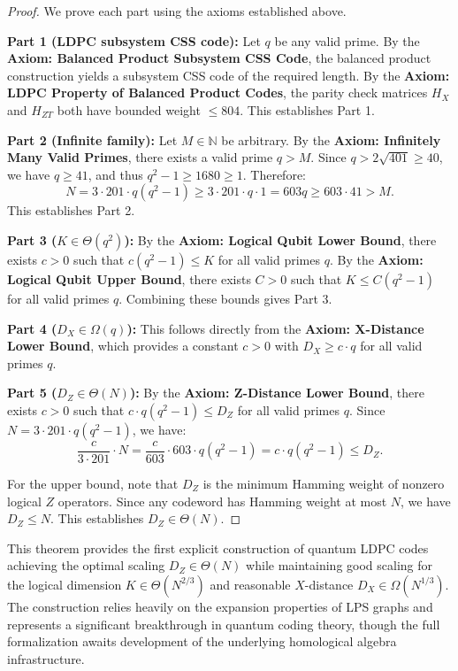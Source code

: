 \documentclass[11pt]{article}
\theoremstyle{plain}
\theoremstyle{definition}
\theoremstyle{remark}
\begin{document}
\begin{proof}
We prove each part using the axioms established above.

\textbf{Part 1 (LDPC subsystem CSS code):} Let $q$ be any valid prime. By the \textbf{Axiom: Balanced Product Subsystem CSS Code}, the balanced product construction yields a subsystem CSS code of the required length. By the \textbf{Axiom: LDPC Property of Balanced Product Codes}, the parity check matrices $H_X$ and $H_{ZT}$ both have bounded weight $\leq 804$. This establishes Part 1.

\textbf{Part 2 (Infinite family):} Let $M \in \mathbb{N}$ be arbitrary. By the \textbf{Axiom: Infinitely Many Valid Primes}, there exists a valid prime $q > M$. Since $q > 2\sqrt{401} \geq 40$, we have $q \geq 41$, and thus $q^2 - 1 \geq 1680 \geq 1$. Therefore:
\[
N = 3 \cdot 201 \cdot q(q^2-1) \geq 3 \cdot 201 \cdot q \cdot 1 = 603q \geq 603 \cdot 41 > M.
\]
This establishes Part 2.

\textbf{Part 3 ($K \in \Theta(q^2)$):} By the \textbf{Axiom: Logical Qubit Lower Bound}, there exists $c > 0$ such that $c(q^2-1) \leq K$ for all valid primes $q$. By the \textbf{Axiom: Logical Qubit Upper Bound}, there exists $C > 0$ such that $K \leq C(q^2-1)$ for all valid primes $q$. Combining these bounds gives Part 3.

\textbf{Part 4 ($D_X \in \Omega(q)$):} This follows directly from the \textbf{Axiom: X-Distance Lower Bound}, which provides a constant $c > 0$ with $D_X \geq c \cdot q$ for all valid primes $q$.

\textbf{Part 5 ($D_Z \in \Theta(N)$):} By the \textbf{Axiom: Z-Distance Lower Bound}, there exists $c > 0$ such that $c \cdot q(q^2-1) \leq D_Z$ for all valid primes $q$. Since $N = 3 \cdot 201 \cdot q(q^2-1)$, we have:
\[
\frac{c}{3 \cdot 201} \cdot N = \frac{c}{603} \cdot 603 \cdot q(q^2-1) = c \cdot q(q^2-1) \leq D_Z.
\]

For the upper bound, note that $D_Z$ is the minimum Hamming weight of nonzero logical $Z$ operators. Since any codeword has Hamming weight at most $N$, we have $D_Z \leq N$. This establishes $D_Z \in \Theta(N)$.
\end{proof}

This theorem provides the first explicit construction of quantum LDPC codes achieving the optimal scaling $D_Z \in \Theta(N)$ while maintaining good scaling for the logical dimension $K \in \Theta(N^{2/3})$ and reasonable $X$-distance $D_X \in \Omega(N^{1/3})$. The construction relies heavily on the expansion properties of LPS graphs and represents a significant breakthrough in quantum coding theory, though the full formalization awaits development of the underlying homological algebra infrastructure.
\end{document}
